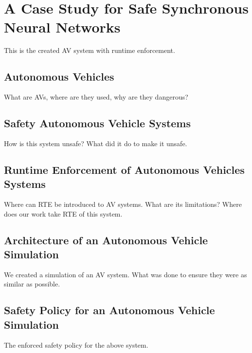 \section{A Case Study for Safe Synchronous Neural Networks}
This is the created AV system with runtime enforcement.

\subsection{Autonomous Vehicles}
What are AVs, where are they used, why are they dangerous?

\subsection{Safety Autonomous Vehicle Systems}
How is this system unsafe? What did it do to make it unsafe.

\subsection{Runtime Enforcement of Autonomous Vehicles Systems}
Where can RTE be introduced to AV systems. What are its limitations? 
Where does our work take RTE of this system.

\subsection{Architecture of an Autonomous Vehicle Simulation}
We created a simulation of an AV system.
What was done to ensure they were as similar as possible.

\subsection{Safety Policy for an Autonomous Vehicle Simulation}
The enforced safety policy for the above system.